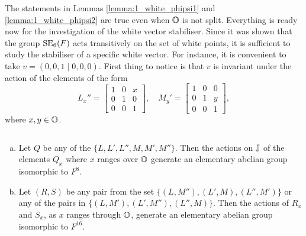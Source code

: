 The statements in Lemmas \ref{lemma:1_white_phipsi1} and \ref{lemma:1_white_phipsi2} are
true even when $\mathbb{O}$ is not split. Everything is ready now for the investigation of the white vector stabiliser. Since it was shown
that the group $\mathrm{SE}_6(F)$ acts transitively on the set of white points, it is sufficient to
study the stabiliser of a specific white vector.  For instance, it is convenient to take
$v = (0,0,1\mid 0,0,0)$. First thing to notice is that $v$ is invariant under the action of the
elements of the form
\begin{equation}
    L_x'' = \begin{bmatrix}
        1&0&x \\
        0&1&0 \\
        0&0&1
    \end{bmatrix},\quad 
    M_y' = \begin{bmatrix}
        1&0&0\\
        0&1&y\\
        0&0&1
    \end{bmatrix},
\end{equation}
where $x,y \in \mathbb{O}$.

\begin{lemma}$ $
	\label{lemma:1_q16}
	\begin{enumerate}[(a)]
		\item Let $Q$ be any of the $\{L,L',L'',M,M',M''\}$. 
		Then the actions on $\mathbb{J}$ of the 
		elements $Q_x$ where $x$ ranges over $\mathbb{O}$ generate an elementary abelian group 
		isomorphic to $F^8$. 
		
		\item Let $(R, S)$ be any pair from the set 
		$\{(L,M''), (L',M), (L'',M')\}$ or any of the pairs in
		$\{(L,M'), (L',M''), (L'',M)\}$. Then
		the actions of $R_x$ and $S_x$, as $x$ ranges through $\mathbb{O}$, 
		generate an elementary abelian 
		group isomorphic to $F^{16}$. 
	\end{enumerate}
\end{lemma}

